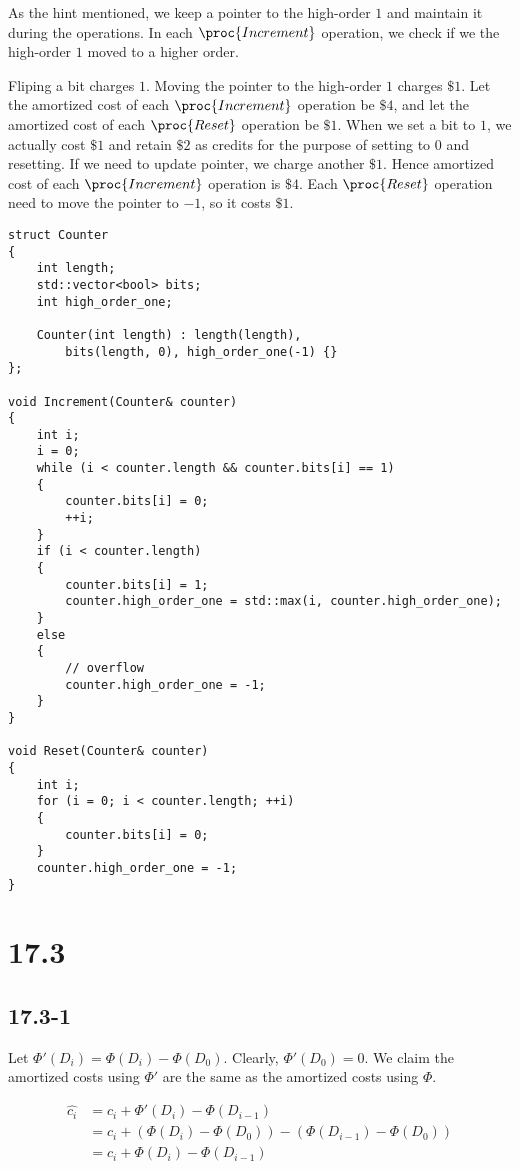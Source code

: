 As the hint mentioned,
we keep a pointer to the high-order $1$
and maintain it during the operations.
In each $\proc{Increment}$ operation,
we check if we the high-order $1$ moved to a higher order.

Fliping a bit charges $1$.
Moving the pointer to the high-order $1$ charges $\$1$.
Let the amortized cost of each $\proc{Increment}$ operation be $\$4$,
and let the amortized cost of each $\proc{Reset}$ operation be $\$1$.
When we set a bit to $1$, we actually cost $\$1$ and retain $\$2$ as credits
for the purpose of setting to $0$ and resetting.
If we need to update pointer, we charge another $\$1$.
Hence amortized cost of each $\proc{Increment}$ operation is $\$4$.
Each $\proc{Reset}$ operation need to move the pointer to $-1$,
so it costs $\$1$.

\begin{verbatim}
struct Counter
{
    int length;
    std::vector<bool> bits;
    int high_order_one;

    Counter(int length) : length(length), 
        bits(length, 0), high_order_one(-1) {}
};

void Increment(Counter& counter)
{
    int i;
    i = 0;
    while (i < counter.length && counter.bits[i] == 1)
    {
        counter.bits[i] = 0;
        ++i;
    }
    if (i < counter.length)
    {
        counter.bits[i] = 1;
        counter.high_order_one = std::max(i, counter.high_order_one);
    }
    else
    {
        // overflow
        counter.high_order_one = -1;
    }
}

void Reset(Counter& counter)
{
    int i;
    for (i = 0; i < counter.length; ++i)
    {
        counter.bits[i] = 0;
    }
    counter.high_order_one = -1;
}
\end{verbatim}

\section*{17.3}

\subsection*{17.3-1}

Let $\Phi'(D_i) = \Phi(D_i) - \Phi(D_0)$.
Clearly, $\Phi'(D_0) = 0$.
We claim the amortized costs using $\Phi'$ are the same
as the amortized costs using $\Phi$.

\begin{equation*}
    \begin{split}
        \hat{c_i} & = c_i + \Phi'(D_i) - \Phi(D_{i-1}) \\
        & = c_i + (\Phi(D_i) - \Phi(D_0)) - (\Phi(D_{i-1}) - \Phi(D_0)) \\
        & = c_i + \Phi(D_i) - \Phi(D_{i-1}) \\
    \end{split}
\end{equation*}
    
